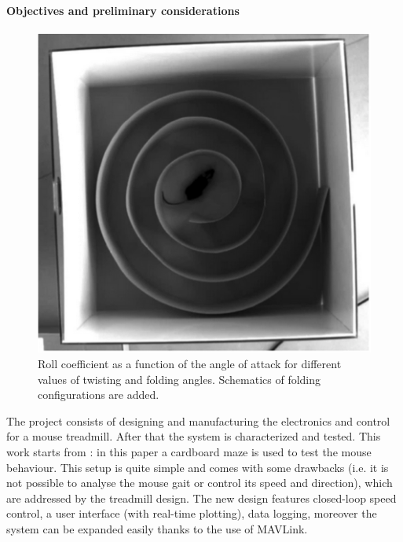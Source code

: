 \documentclass[12pt,a4paper]{article}
\begin{document}
\begin{multicols}{2}
[]

\paragraph{Objectives and preliminary considerations} 
\lfoot{\today}
\begin{figure}[H]
	\centering
	\includegraphics[width=0.9\linewidth]{fig/OleSetup}
	\caption{Roll coefficient as a function of the angle of attack for different values of twisting and folding angles. Schematics of folding configurations are added. }\label{fig:tw_vs_fold_bar}
\end{figure}
The project consists of designing and manufacturing the electronics and control for a mouse treadmill. After that the system is characterized and tested. This work starts from \cite{Ole}: in this paper a cardboard maze is used to test the mouse behaviour. This setup is quite simple and comes with some drawbacks (i.e. it is not possible to analyse the mouse gait or control its speed and direction), which are addressed by the treadmill design. The new design features closed-loop speed control, a user interface (with real-time plotting), data logging, moreover the system can be expanded easily thanks to the use of MAVLink.


\end{multicols}
\end{document}
